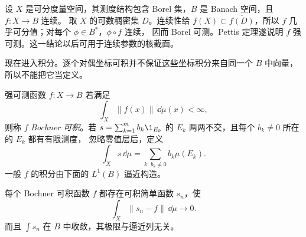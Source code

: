 \begin{example}[连续映射的强可测性]\label{ex:3-4-2-3}
设 $X$ 是可分度量空间，其测度结构包含 Borel 集，$B$ 是 Banach 空间，且 $f:X\to B$ 连续。
取 $X$ 的可数稠密集 $D$。连续性给
$f(X)\subset\overline{f(D)}$，所以 $f$ 几乎可分值；对每个 $\phi\in B^*$，$\phi\circ f$ 连续，
因而 Borel 可测。Pettis 定理遂说明 $f$ 强可测。这一结论以后可用于连续参数的核截面。
\end{example}

现在进入积分。逐个对偶坐标可积并不保证这些坐标积分来自同一个 $B$ 中向量，所以不能把它当定义。

\begin{definition}[Bochner 可积]\label{def:3-4-2-3}
强可测函数 $f:X\to B$ 若满足
\[
  \int_X\|f(x)\|\,\dd\mu(x)<\infty,
\]
则称 $f$ \emph{Bochner 可积}。若
$s=\sum_{k=1}^m b_k\1_{E_k}$ 的 $E_k$ 两两不交，且每个 $b_k\ne0$ 所在的 $E_k$ 都有有限测度，
忽略零值层后，定义
\[
  \int_Xs\,\dd\mu=\sum_{k:\,b_k\ne0} b_k\mu(E_k).
  \tag{3.4.9}\label{eq:simple-bochner-integral}
\]
一般 $f$ 的积分由下面的 $L^1(B)$ 逼近构造。
\end{definition}

\begin{lemma}\label{lemma:3-4-2-bochner-construction}
每个 Bochner 可积函数 $f$ 都存在可积简单函数 $s_n$，使
\[
  \int_X\|s_n-f\|\,\dd\mu\longrightarrow0.
  \tag{3.4.10}\label{eq:bochner-simple-l1-approximation}
\]
而且 $\int s_n$ 在 $B$ 中收敛，其极限与逼近列无关。
\end{lemma}

